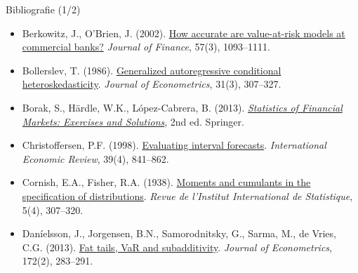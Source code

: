\begin{frame}{Bibliografie (1/2)}
\begin{itemize}
    \item Berkowitz, J., O'Brien, J. (2002). \href{https://doi.org/10.1111/1540-6261.00455}{How accurate are value-at-risk models at commercial banks?} \textit{Journal of Finance}, 57(3), 1093--1111.
    \item Bollerslev, T. (1986). \href{https://doi.org/10.1016/0304-4076(86)90063-1}{Generalized autoregressive conditional heteroskedasticity}. \textit{Journal of Econometrics}, 31(3), 307--327.
    \item Borak, S., Härdle, W.K., López-Cabrera, B. (2013). \href{https://doi.org/10.1007/978-3-642-33929-5}{\textit{Statistics of Financial Markets: Exercises and Solutions}}, 2nd ed. Springer.
    \item Christoffersen, P.F. (1998). \href{https://doi.org/10.2307/2527341}{Evaluating interval forecasts}. \textit{International Economic Review}, 39(4), 841--862.
    \item Cornish, E.A., Fisher, R.A. (1938). \href{https://doi.org/10.2307/1400905}{Moments and cumulants in the specification of distributions}. \textit{Revue de l'Institut International de Statistique}, 5(4), 307--320.
    \item Daníelsson, J., Jorgensen, B.N., Samorodnitsky, G., Sarma, M., de Vries, C.G. (2013). \href{https://doi.org/10.1016/j.jeconom.2012.08.011}{Fat tails, VaR and subadditivity}. \textit{Journal of Econometrics}, 172(2), 283--291.
\end{itemize}
\end{frame}

